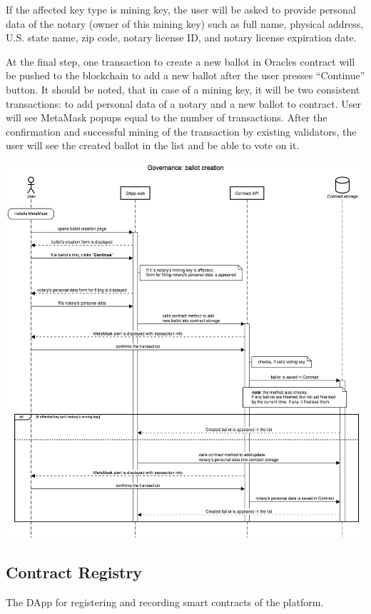 \documentclass[12pt]{report}
\begin{document}
If the affected key type is mining key, the user will be asked to provide personal data of the notary (owner of this mining key) such as full name, physical address, U.S. state name, zip code, notary license ID, and notary license expiration date.

At the final step, one transaction to create a new ballot in Oracles contract will be pushed to the blockchain to add a new ballot after the user presses “Continue” button. It should be noted, that in case of a mining key, it will be two consistent transactions: to add personal data of a notary and a new ballot to contract. User will see MetaMask popups equal to the number of transactions. After the confirmation and successful mining of the transaction by existing validators, the user will see the created ballot in the list and be able to vote on it. 

\includegraphics[width=\textwidth]{creation-ballot}

\subsection{Contract Registry}
\label{tech-apps-contracts-registry}
The DApp for registering and recording smart contracts of the platform.
\end{document}
